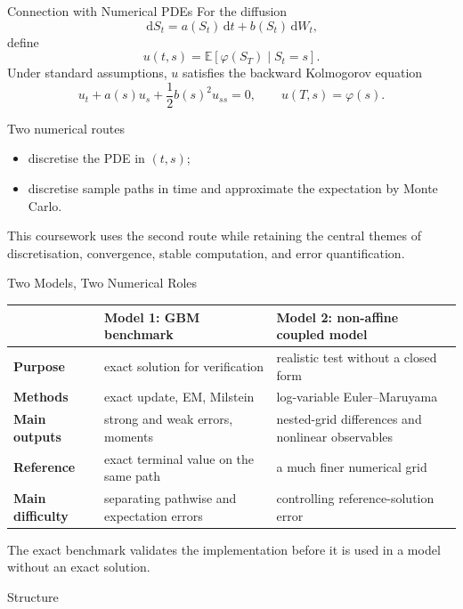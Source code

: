 \documentclass[aspectratio=169,10pt]{beamer}
\newcommand{\E}{\mathbb{E}}
\newcommand{\dd}{\,\mathrm{d}}
\newcommand{\good}[1]{\textcolor{CourseTeal}{#1}}
\begin{document}
\begin{frame}{Connection with Numerical PDEs}
  For the diffusion
  \[
    \dd S_t=a(S_t)\dd t+b(S_t)\dd W_t,
  \]
  define
  \[
    u(t,s)=\E\!\left[\varphi(S_T)\mid S_t=s\right].
  \]
  Under standard assumptions, $u$ satisfies the backward Kolmogorov equation
  \[
    u_t+a(s)u_s+\frac12 b(s)^2u_{ss}=0,
    \qquad u(T,s)=\varphi(s).
  \]
  \begin{block}{Two numerical routes}
    \begin{itemize}
      \item discretise the PDE in $(t,s)$;
      \item discretise sample paths in time and approximate the expectation by Monte Carlo.
    \end{itemize}
  \end{block}
  This coursework uses the second route while retaining the central themes of
  \alert{discretisation, convergence, stable computation, and error quantification}.
\end{frame}

\begin{frame}{Two Models, Two Numerical Roles}
  \begin{tabularx}{\textwidth}{>{\bfseries}p{2.3cm}XX}
    \toprule
      & Model 1: GBM benchmark & Model 2: non-affine coupled model \\
    \midrule
    Purpose & exact solution for verification & realistic test without a closed form \\
    Methods & exact update, EM, Milstein & log-variable Euler--Maruyama \\
    Main outputs & strong and weak errors, moments & nested-grid differences and nonlinear observables \\
    Reference & exact terminal value on the same path & a much finer numerical grid \\
    Main difficulty & separating pathwise and expectation errors & controlling reference-solution error \\
    \bottomrule
  \end{tabularx}
  \vspace{0.7em}

  \centering
  \good{The exact benchmark validates the implementation before it is used in a model without an exact solution.}
\end{frame}

\begin{frame}{Structure}
  \tableofcontents[hideallsubsections]
\end{frame}
\end{document}
